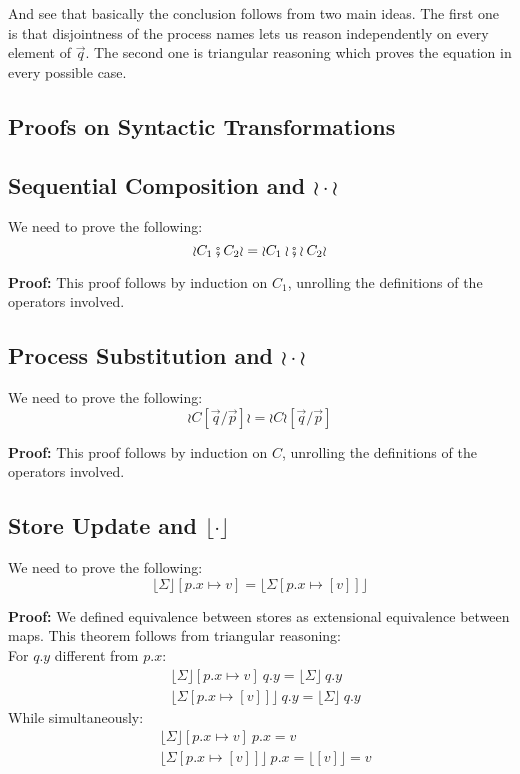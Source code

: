 \documentclass[12pt,a4paper,twoside]{book}
\begin{document}
And see that basically the conclusion follows from two main ideas. The first one is that disjointness of the process names lets us reason independently on every element of $\vec{q}$. The second one is triangular reasoning which proves the equation in every possible case.
\begin{appendices}
\chapter{Proofs on Syntactic Transformations}
\label{appdix:A}
\section{Sequential Composition and $\wr \cdot \wr$}
We need to prove the following:
$$\wr C_1 \fatsemi C_2 \wr = \wr C_1 \wr \fatsemi \wr C_2 \wr$$

\noindent\textbf{Proof:}
This proof follows by induction on $C_1$, unrolling the definitions of the operators involved.

\section{Process Substitution and $\wr \cdot \wr$}
We need to prove the following:
$$\wr C [\vec{q}/\vec{p}] \wr = \wr C \wr [\vec{q}/\vec{p}]$$

\noindent\textbf{Proof:}
This proof follows by induction on $C$, unrolling the definitions of the operators involved.

\section{Store Update and $\lfloor \cdot \rfloor$}
We need to prove the following:
$$\lfloor \Sigma \rfloor[p.x \mapsto v] = \lfloor \Sigma[p.x \mapsto [v]] \rfloor$$

\noindent\textbf{Proof:}
We defined equivalence between stores as extensional equivalence between maps.
This theorem follows from triangular reasoning:\\
For $q.y$ different from $p.x$:
\begin{align*}
&\lfloor \Sigma \rfloor[p.x \mapsto v]~q.y = \lfloor \Sigma \rfloor~q.y\\
&\lfloor \Sigma [p.x \mapsto [v]] \rfloor~q.y = \lfloor \Sigma \rfloor~q.y
\end{align*}
While simultaneously:
\begin{align*}
&\lfloor \Sigma \rfloor[p.x \mapsto v]~p.x = v\\
&\lfloor \Sigma [p.x \mapsto [v]] \rfloor~p.x = \lfloor [v] \rfloor = v
\end{align*}



\end{appendices}
\end{document}
